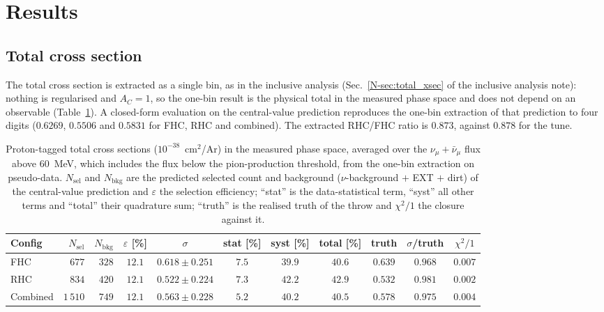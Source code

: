 \documentclass[11pt,a4paper]{article}
\newcommand{\noteref}[2]{#1~\ref{N-#2} of the inclusive analysis note}
\begin{document}
\section{Results}
\label{sec:pt_proposed}

\subsection{Total cross section}
\label{sec:pt_total}

The total cross section is extracted as a single bin, as in the inclusive analysis
(\noteref{Sec.}{sec:total_xsec}): nothing is regularised and $A_C=1$, so the one-bin result is the
physical total in the measured phase space and does not depend on an observable
(Table~\ref{tab:pt_total}). A closed-form evaluation on the central-value
prediction reproduces the one-bin extraction of that prediction to four digits ($0.6269$, $0.5506$
and $0.5831$ for FHC, RHC and combined). The extracted RHC/FHC ratio is $0.873$, against $0.878$ for
the tune.

\begin{table}[H]
  \centering
  \caption{Proton-tagged total cross sections ($10^{-38}$~cm$^2$/Ar) in the measured phase space,
    averaged over the $\nu_\mu+\bar\nu_\mu$ flux above $60$~MeV, which includes the flux below the
    pion-production threshold, from the one-bin extraction on
    pseudo-data. $N_\mathrm{sel}$ and $N_\mathrm{bkg}$ are the
    predicted selected count and background ($\nu$-background $+$ EXT $+$ dirt) of the central-value
    prediction and $\varepsilon$ the selection efficiency; ``stat'' is the data-statistical term,
    ``syst'' all other terms and ``total'' their quadrature sum; ``truth'' is the realised truth of the
    throw and $\chi^2/1$ the closure against it.}
  \label{tab:pt_total}
  \footnotesize
  \begin{tabular}{lrrcccccccc}
\toprule
Config & $N_\mathrm{sel}$ & $N_\mathrm{bkg}$ & $\varepsilon$ [\%] & $\sigma$ & stat [\%] & syst [\%] & total [\%] & truth & $\sigma$/truth & $\chi^2/1$ \\
\midrule
    FHC      & $677$ & $328$ & $12.1$ & $0.618\pm0.251$ & $7.5$ & $39.9$ & $40.6$ & $0.639$ & $0.968$ & $0.007$ \\
    RHC      & $834$ & $420$ & $12.1$ & $0.522\pm0.224$ & $7.3$ & $42.2$ & $42.9$ & $0.532$ & $0.981$ & $0.002$ \\
    Combined & $1\,510$ & $749$ & $12.1$ & $0.563\pm0.228$ & $5.2$ & $40.2$ & $40.5$ & $0.578$ & $0.975$ & $0.004$ \\
\bottomrule
\end{tabular}
\end{table}
\end{document}
